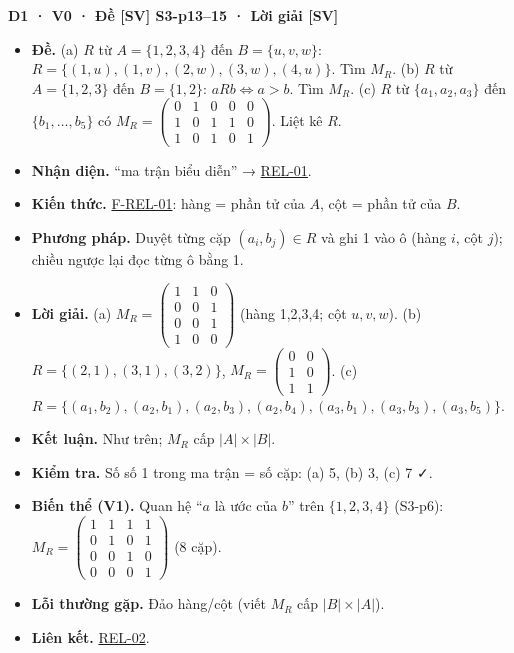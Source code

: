 \documentclass[
  10pt,
  twoside,openany]{book}
\providecommand{\tightlist}{%
  \setlength{\itemsep}{0pt}\setlength{\parskip}{0pt}}
\begin{document}
\textbf{D1 · V0 · Đề {[}SV{]} S3-p13--15 · Lời giải {[}SV{]}}

\begin{itemize}
\tightlist
\item
  \textbf{Đề.} (a) \(R\) từ \(A=\{1,2,3,4\}\) đến \(B=\{u,v,w\}\):
  \(R=\{(1,u),(1,v),(2,w),(3,w),(4,u)\}\). Tìm \(M_R\). (b) \(R\) từ
  \(A=\{1,2,3\}\) đến \(B=\{1,2\}\): \(aRb\Leftrightarrow a>b\). Tìm
  \(M_R\). (c) \(R\) từ \(\{a_1,a_2,a_3\}\) đến \(\{b_1,\dots,b_5\}\) có
  \(M_R=\begin{pmatrix}0&1&0&0&0\\1&0&1&1&0\\1&0&1&0&1\end{pmatrix}\).
  Liệt kê \(R\).
\item
  \textbf{Nhận diện.} ``ma trận biểu diễn'' →
  \protect\hyperlink{REL-01}{REL-01}.
\item
  \textbf{Kiến thức.} \protect\hyperlink{F-REL-01}{F-REL-01}: hàng =
  phần tử của \(A\), cột = phần tử của \(B\).
\item
  \textbf{Phương pháp.} Duyệt từng cặp \((a_i,b_j)\in R\) và ghi 1 vào ô
  (hàng \(i\), cột \(j\)); chiều ngược lại đọc từng ô bằng 1.
\item
  \textbf{Lời giải.} (a)
  \(M_R=\begin{pmatrix}1&1&0\\0&0&1\\0&0&1\\1&0&0\end{pmatrix}\) (hàng
  1,2,3,4; cột \(u,v,w\)). (b) \(R=\{(2,1),(3,1),(3,2)\}\),
  \(M_R=\begin{pmatrix}0&0\\1&0\\1&1\end{pmatrix}\). (c)
  \(R=\{(a_1,b_2),(a_2,b_1),(a_2,b_3),(a_2,b_4),(a_3,b_1),(a_3,b_3),(a_3,b_5)\}\).
\item
  \textbf{Kết luận.} Như trên; \(M_R\) cấp \(|A|\times|B|\).
\item
  \textbf{Kiểm tra.} Số số 1 trong ma trận = số cặp: (a) 5, (b) 3, (c) 7
  ✓.
\item
  \textbf{Biến thể (V1).} Quan hệ ``\(a\) là ước của \(b\)'' trên
  \(\{1,2,3,4\}\) (S3-p6):
  \(M_R=\begin{pmatrix}1&1&1&1\\0&1&0&1\\0&0&1&0\\0&0&0&1\end{pmatrix}\)
  (8 cặp).
\item
  \textbf{Lỗi thường gặp.} Đảo hàng/cột (viết \(M_R\) cấp
  \(|B|\times|A|\)).
\item
  \textbf{Liên kết.} \protect\hyperlink{REL-02}{REL-02}.
\end{itemize}
\end{document}
